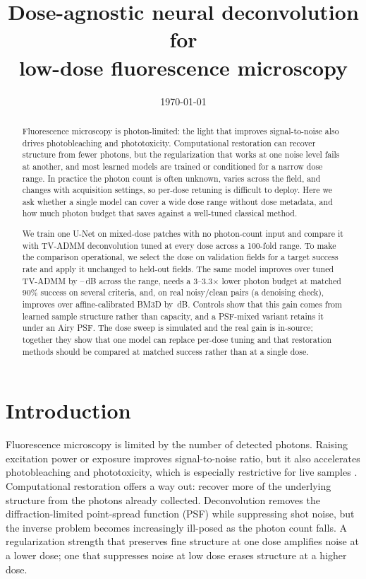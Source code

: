 \documentclass[10pt]{article}
\title{\bfseries Dose-agnostic neural deconvolution for\\
low-dose fluorescence microscopy}
\author{}
\date{\today}
\begin{document}
\maketitle

\begin{abstract}
Fluorescence microscopy is photon-limited: the light that improves
signal-to-noise also drives photobleaching and phototoxicity. Computational
restoration can recover structure from fewer photons, but the regularization
that works at one noise level fails at another, and most learned models are
trained or conditioned for a narrow dose range. In practice the photon count is
often unknown, varies across the field, and changes with acquisition settings,
so per-dose retuning is difficult to deploy. Here we ask whether a single model
can cover a wide dose range without dose metadata, and how much photon budget
that saves against a well-tuned classical method.

We train one U-Net on mixed-dose patches with no photon-count input and compare
it with TV-ADMM deconvolution tuned at every dose across a 100-fold range. To
make the comparison operational, we select the dose on validation fields for a
target success rate and apply it unchanged to held-out fields. The same model
improves over tuned TV-ADMM by \BestGainMin--\BestGainMax\,dB across the range,
needs a 3--3.3$\times$ lower photon budget at matched 90\% success on several
criteria, and, on real noisy/clean pairs (a denoising check), improves over
affine-calibrated BM3D by \RealGain\,dB. Controls show that this gain comes
from learned sample structure rather than capacity, and a PSF-mixed variant
retains it under an Airy PSF. The dose sweep is simulated and the real gain is
in-source; together they show that one model can replace per-dose tuning and
that restoration methods should be compared at matched success rather than at a
single dose.
\end{abstract}

\section{Introduction}
Fluorescence microscopy is limited by the number of detected photons. Raising
excitation power or exposure improves signal-to-noise ratio, but it also
accelerates photobleaching and phototoxicity, which is especially restrictive
for live samples \cite{laissue2017phototoxicity}. Computational restoration
offers a way out: recover more of the underlying structure from the photons
already collected. Deconvolution removes the diffraction-limited point-spread
function (PSF) while suppressing shot noise, but the inverse problem becomes
increasingly ill-posed as the photon count falls. A regularization strength
that preserves fine structure at one dose amplifies noise at a lower dose; one
that suppresses noise at low dose erases structure at a higher dose.
\end{document}

